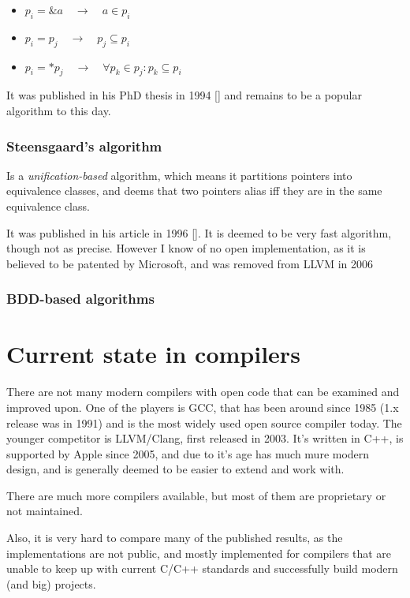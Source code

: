 \begin{itemize}
	\item $p_i = \&a \quad \to \quad a \in p_i$
	\item $p_i = p_j \quad \to \quad p_j \subseteq p_i$ 
	\item $p_i = *p_j \quad \to \quad \forall p_k \in p_j : p_k \subseteq p_i$
\end{itemize}

It was published in his PhD thesis in 1994 [] and remains to be a
popular algorithm to this day.


\subsubsection{Steensgaard's algorithm}

Is a {\it unification-based} algorithm, which means it partitions pointers into
equivalence classes, and deems that two pointers alias iff they are in the same
equivalence class.

It was published in his article in 1996 []. It is deemed to be very
fast algorithm, though not as precise. However I know of no open implementation,
as it is believed to be patented by Microsoft, and was removed from LLVM in 2006


\subsubsection{BDD-based algorithms}



\section{Current state in compilers}

There are not many modern compilers with open code that can be examined and improved
upon. One of the players is GCC, that has been around since 1985
(1.x release was in 1991) and is the most widely used open source compiler
today. The younger competitor is LLVM/Clang, first released in 2003. It's
written in C++, is supported by Apple since 2005, and due to it's age has much
mure modern design, and is generally deemed to be easier to extend and work
with.

There are much more compilers available, but most of them are proprietary or not
maintained.

Also, it is very hard to compare many of the published results, as the
implementations are not public, and mostly implemented for compilers that are
unable to keep up with current C/C++ standards and successfully build modern
(and big) projects.

